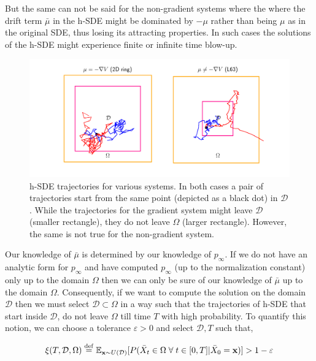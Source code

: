 But the same can not be said for the non-gradient systems where the where the drift term $\bar{\mu}$ in the h-SDE might be dominated by $-\mu$ rather than being $\mu$ as in the original SDE, thus losing its attracting properties. In such cases the solutions of the h-SDE might experience finite or infinite time blow-up.
\begin{figure}[!ht]
    \centering
\includegraphics[scale=0.55]{dynamic-fp/plots/h-SDE.png}
    \caption{h-SDE trajectories for various systems. In both cases a pair of trajectories start from the same point (depicted as a black dot) in $\mathcal D$. While the trajectories for the gradient system might leave $\mathcal D$ (smaller rectangle), they do not leave $\Omega$ (larger rectangle). However, the same is not true for the non-gradient system.}
    \label{fig:h-SDE--dynamic-fp}
\end{figure}

Our knowledge of $\bar{\mu}$ is determined by our knowledge of $p_\infty$. If we do not have an analytic form for $p_\infty$ and have computed $p_\infty$ (up to the normalization constant) only up to the domain $\Omega$ then we can only be sure of our knowledge of $\bar{\mu}$ up to the domain $\Omega$. Consequently, if we want to compute the solution on the domain $\mathcal D$ then we must select $\mathcal D\subset\Omega$ in a way such that the trajectories of h-SDE that start inside $\mathcal D$, do not leave $\Omega$ till time $T$ with high probability. To quantify this notion, we can choose a tolerance $\varepsilon>0$ and select $\mathcal D, T$ such that,


\begin{align}
    \xi(T, \mathcal D, \Omega)\stackrel{\rm def}{=}\mathbb E_{\mathbf x\sim U(\mathcal D)}[P(\bar X_t\in\Omega\;\forall\;t\in[0, T]|\bar X_0=\mathbf x)] > 1-\varepsilon\label{eq:xi-defn--dynamic-fp}
\end{align}

